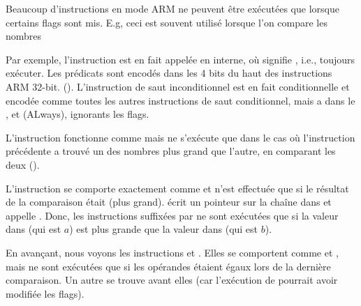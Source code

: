 \label{subsec:jcc_ARM}

\mysubparagraph{\OptimizingKeilVI (\ARMMode)}




Beaucoup d'instructions en mode ARM ne peuvent être exécutées que lorsque certains
flags sont mis.
E.g, ceci est souvent utilisé lorsque l'on compare les nombres


Par exemple, l'instruction \ADD est en fait appelée  en interne, où 
signifie , i.e., toujours exécuter.
Les prédicats sont encodés dans les 4 bits du haut des instructions ARM 32-bit. ().
L'instruction de saut inconditionnel  est en fait conditionnelle et encodée
comme toutes les autres instructions de saut conditionnel, mais a  dans le
, et  (ALways), ignorants les flags.


L'instruction  fonctionne comme  mais ne s'exécute que dans le
cas où l'instruction \CMP précédente a trouvé un des nombres plus grand que l'autre,
en comparant les deux ().


L'instruction  se comporte exactement comme  et n'est effectuée
que si le résultat de la comparaison était  (plus grand).
 écrit un pointeur sur la chaîne  dans 
et  appelle \printf.
Donc, les instructions suffixées par  ne sont exécutées que si la valeur
dans  (qui est $a$) est plus grande que la valeur dans  (qui est $b$).


En avançant, nous voyons les instructions  et .
Elles se comportent comme  et , mais ne sont exécutées que si les
opérandes étaient égaux lors de la dernière comparaison.
Un autre \CMP se trouve avant elles (car l'exécution de \printf pourrait avoir
modifiée les flags).

